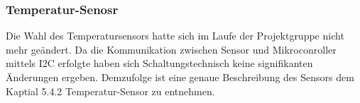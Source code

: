 ﻿\subsubsection{Temperatur-Senosr} \label{temp-1}

Die Wahl des Temperatursensors hatte sich im Laufe der Projektgruppe nicht mehr geändert. Da die Kommunikation zwischen Sensor und Mikroconroller mittels I2C erfolgte haben sich Schaltungstechnisch keine signifikanten Änderungen ergeben.
Demzufolge ist eine genaue Beschreibung des Sensors dem Kaptial 5.4.2 Temperatur-Sensor zu entnehmen.



